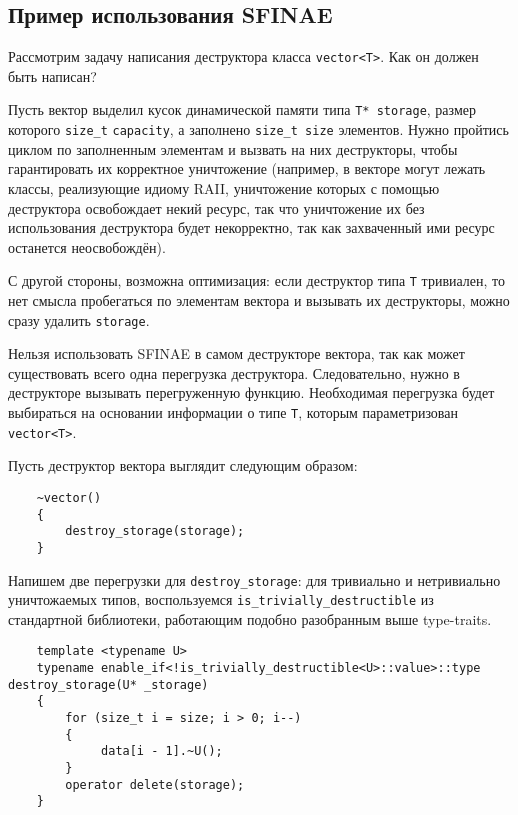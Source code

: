 	\subsection{Пример использования SFINAE}
	
	Рассмотрим задачу написания деструктора класса \texttt{vector<T>}. Как он должен быть написан? 
	
	Пусть вектор выделил кусок динамической памяти типа \texttt{T* storage}, размер которого \texttt{size_t} \texttt{capacity}, а заполнено \texttt{size_t size} элементов. Нужно пройтись циклом по заполненным элементам и вызвать на них деструкторы, чтобы гарантировать их корректное уничтожение (например, в векторе могут лежать классы, реализующие идиому RAII, уничтожение которых с помощью деструктора освобождает некий ресурс, так что уничтожение их без использования деструктора будет некорректно, так как захваченный ими ресурс останется неосвобождён).
	
	С другой стороны, возможна оптимизация: если деструктор типа \texttt{T} тривиален, то нет смысла пробегаться по элементам вектора и вызывать их деструкторы, можно сразу удалить \texttt{storage}.
	 
	Нельзя использовать SFINAE в самом деструкторе вектора, так как может существовать всего одна перегрузка деструктора. Следовательно, нужно в деструкторе вызывать перегруженную функцию. Необходимая перегрузка будет выбираться на основании информации о типе \texttt{T}, которым параметризован \texttt{vector<T>}.
	 
	Пусть деструктор вектора выглядит следующим образом:

	\begin{verbatim}
	~vector()
	{
	    destroy_storage(storage);
	}
	\end{verbatim}
	
	Напишем две перегрузки для \texttt{destroy_storage}: для тривиально и нетривиально уничтожаемых типов, воспользуемся \texttt{is_trivially_destructible} из стандартной библиотеки, работающим подобно разобранным выше type-traits.
	
	\begin{verbatim}
	template <typename U>
	typename enable_if<!is_trivially_destructible<U>::value>::type destroy_storage(U* _storage)
	{
	    for (size_t i = size; i > 0; i--)
	    {
	         data[i - 1].~U();
	    }
	    operator delete(storage);
	}
	\end{verbatim}
	
